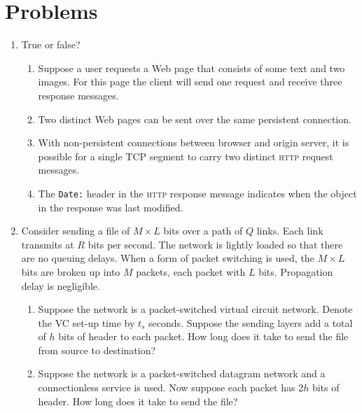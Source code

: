 \documentclass[12pt,a4paper]{article}
\begin{document}
\section{Problems}

\begin{enumerate}

  \item True or false?
  \begin{enumerate}

    \item Suppose a user requests a Web page that consists of some text
      and two images. For this page the client will send one request
      and receive three response messages.

    \item Two distinct Web pages can be sent over the same persistent
      connection.

    \item With non-persistent connections between browser and origin
      ser\-ver, it is possible for a single TCP segment to carry two
      distinct \textsc{http} request messages.

    \item The \verb+Date:+ header in the \textsc{http} response
      message indicates when the object in the response was last
      modified.

  \end{enumerate}

  \item Consider sending a file of \(M \times L\) bits over a path of
    \(Q\) links. Each link transmits at \(R\) bits per second. The
    network is lightly loaded so that there are no queuing
    delays. When a form of packet switching is used, the \(M \times
    L\) bits are broken up into \(M\) packets, each packet with \(L\)
    bits. Propagation delay is negligible.
    \begin{enumerate}

      \item Suppose the network is a packet-switched virtual circuit
        network. Denote the VC set-up time by \(t_s\) seconds. Suppose
        the sending layers add a total of \(h\) bits of header to each
        packet. How long does it take to send the file from source to
        destination?

      \item \label{datagram} Suppose the network is a packet-switched
        datagram network and a connectionless service is used. Now
        suppose each packet has \(2h\) bits of header. How long does
        it take to send the file?


\end{enumerate}
\end{enumerate}
\end{document}
